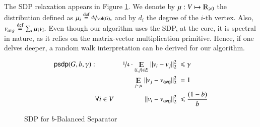 \documentclass[twoside,leqno,twocolumn]{article}
\newcommand{\nfrac}{\nicefrac}
\renewcommand{\mathbb}{\varmathbb}
\renewcommand{\leq}{\leqslant}
\renewcommand{\geq}{\geqslant}
\newcommand{\norm}[1]{\lVert#1\rVert}
\newcommand{\vol}{\mathrm{vol}}
\newcommand{\defeq}{\stackrel{\textup{def}}{=}}
\newcommand{\Esymb}{\mathbb{E}}
\DeclareMathOperator*{\E}{\Esymb}
\newcommand{\BS}{{\sc Balanced Separator}\xspace}
\newcommand{\SDP}{{\sf SDP}\xspace}
\numberwithin{equation}{section}
\newcommand{\psdp}{{\ensuremath{{\mathsf{psdp}}}\xspace}}
\newcommand{\avg}{{\ensuremath{\mathsf{avg}}\xspace}}
\begin{document}
The {{\SDP}} relaxation appears in Figure \ref{fig:sdp-intro}.
We denote by $\mu:V\mapsto \mathbb{R}_{\geq 0}$ the distribution defined as $\mu_{i}\defeq \nfrac{d_{i}}{\vol(G)},$ and by $d_{i}$ the degree of the $i$-th vertex. Also, $v_{avg}\defeq \sum_{i}\mu_{i}v_{i}.$
Even though our algorithm uses the {{\SDP}}, at the core, it is spectral in nature, as it relies on the matrix-vector multiplication primitive. Hence, if one delves deeper, a random walk interpretation can be derived for our algorithm.
\begin{figure}[htb]

\begin{alignat*}{4}
 \psdp(G, b, \gamma): & & \nfrac{1}{4} \cdot \E_{\{i,j\} \in E}\;\norm{v_i-v_j}_2^2 \; \leq& \; \gamma   \\
 & & \E_{j \sim \mu}\; \norm{v_j- v_\avg}_2^2 \;=& \;1 \\
    &\forall {i\in V} \;   &  \norm{v_i- v_\avg}_2^2 \;\leq& \; \frac{(1-b)}{b}
\end{alignat*}
\label{fig:sdp-intro}
\caption{{\SDP} for $b$-\BS}
\end{figure}
\end{document}
